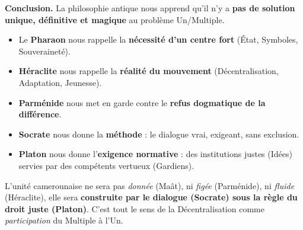 \documentclass[11pt]{article}
\newcommand{\cle}[1]{{\popxbold\color{popdark}#1}}
\begin{document}
\begin{exoresolu}
\textbf{Conclusion.}
La philosophie antique nous apprend qu'il n'y a \textbf{pas de solution unique, définitive et magique} au problème Un/Multiple.
\begin{itemize}
    \item Le \textbf{Pharaon} nous rappelle la \textbf{nécessité d'un centre fort} (État, Symboles, Souveraineté).
    \item \textbf{Héraclite} nous rappelle la \textbf{réalité du mouvement} (Décentralisation, Adaptation, Jeunesse).
    \item \textbf{Parménide} nous met en garde contre le \textbf{refus dogmatique de la différence}.
    \item \textbf{Socrate} nous donne la \textbf{méthode} : le dialogue vrai, exigeant, sans exclusion.
    \item \textbf{Platon} nous donne l'\textbf{exigence normative} : des institutions justes (Idées) servies par des compétents vertueux (Gardiens).
\end{itemize}
L'unité camerounaise ne sera pas \emph{donnée} (Maât), ni \emph{figée} (Parménide), ni \emph{fluide} (Héraclite), elle sera \textbf{construite par le dialogue (Socrate) sous la règle du droit juste (Platon)}. C'est tout le sens de la \cle{Décentralisation} comme \emph{participation} du Multiple à l'Un.
\end{exoresolu}
\end{document}
